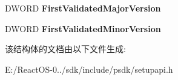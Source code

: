 \begin{DoxyCompactItemize}
\begin{tabbing}
\end{tabbing}\item 
\mbox{\label{struct___s_p___a_l_t_p_l_a_t_f_o_r_m___i_n_f_o___v2_a1e34be96d9833b432845b827caa29d91}} 
D\+W\+O\+RD {\bfseries First\+Validated\+Major\+Version}
\item 
\mbox{\label{struct___s_p___a_l_t_p_l_a_t_f_o_r_m___i_n_f_o___v2_add6aea05238a66f4391bb60883c71e94}} 
D\+W\+O\+RD {\bfseries First\+Validated\+Minor\+Version}
\end{DoxyCompactItemize}


该结构体的文档由以下文件生成\+:\begin{DoxyCompactItemize}
\item 
E\+:/\+React\+O\+S-\/0../sdk/include/psdk/setupapi.\+h\end{DoxyCompactItemize}
